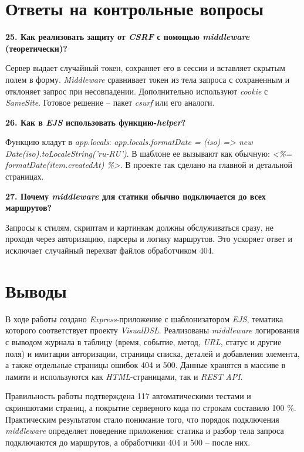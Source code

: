 \documentclass[14pt,a4paper]{extarticle}
\begin{document}
\section{Ответы на контрольные вопросы}

{\noindent\hspace*{1.25cm}\bfseries 25. Как реализовать защиту от \textit{CSRF} с помощью \textit{middleware} (теоретически)?\par}\nopagebreak
Сервер выдает случайный токен, сохраняет его в сессии и вставляет скрытым полем в форму. \textit{Middleware} сравнивает токен из тела запроса с сохраненным и отклоняет запрос при несовпадении. Дополнительно используют \textit{cookie} с \textit{SameSite}. Готовое решение – пакет \textit{csurf} или его аналоги.

{\noindent\hspace*{1.25cm}\bfseries 26. Как в \textit{EJS} использовать функцию-\textit{helper}?\par}\nopagebreak
Функцию кладут в \textit{app.locals}: \textit{app.locals.formatDate = (iso) => new Date(iso).toLocaleString('ru-RU')}. В шаблоне ее вызывают как обычную: \textit{<\%= formatDate(item.createdAt) \%>}. В проекте так сделано на главной и детальной страницах.

{\noindent\hspace*{1.25cm}\bfseries 27. Почему \textit{middleware} для статики обычно подключается до всех маршрутов?\par}\nopagebreak
Запросы к стилям, скриптам и картинкам должны обслуживаться сразу, не проходя через авторизацию, парсеры и логику маршрутов. Это ускоряет ответ и исключает случайный перехват файлов обработчиком 404.

\section{Выводы}

В ходе работы создано \textit{Express}-приложение с шаблонизатором \textit{EJS}, тематика которого соответствует проекту \textit{VisualDSL}. Реализованы \textit{middleware} логирования с выводом журнала в таблицу (время, событие, метод, \textit{URL}, статус и другие поля) и имитации авторизации, страницы списка, деталей и добавления элемента, а также отдельные страницы ошибок 404 и 500. Данные хранятся в массиве в памяти и используются как \textit{HTML}-страницами, так и \textit{REST} \textit{API}.

Правильность работы подтверждена 117 автоматическими тестами и скриншотами страниц, а покрытие серверного кода по строкам составило 100 \%. Практическим результатом стало понимание того, что порядок подключения \textit{middleware} определяет поведение приложения: статика и разбор тела запроса подключаются до маршрутов, а обработчики 404 и 500 – после них.
\end{document}
